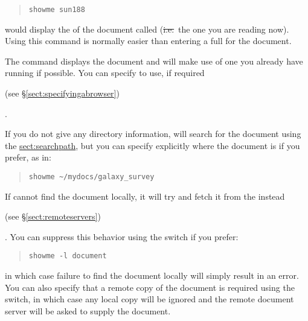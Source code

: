 \begin{quote}
\begin{verbatim}
showme sun188
\end{verbatim}
\end{quote}

would display the  of the
document called  (\st{i.e.}\ the one you
are reading now).  Using this command is normally easier than entering
a full  for the document.

The  command displays the document  and will make use of one you already
have running if possible. You can specify  to use, if required\begin{latexonly}
(see \S\ref{sect:specifyingabrowser})\end{latexonly}.

If you do not give any directory information,  will search
for the document using the \hyperref{\hi{HTX\_PATH} search
path}{\hi{HTX\_PATH} search path (see \S}{)}{sect:searchpath}, but you
can specify explicitly where the document is if you prefer, as in:

\begin{quote}
\begin{verbatim}
showme ~/mydocs/galaxy_survey
\end{verbatim}
\end{quote}

If  cannot find the document locally, it will try and fetch
it from the 
instead\begin{latexonly}
(see \S\ref{sect:remoteservers})
\end{latexonly}.
You can suppress this behavior using the  switch if you prefer:

\begin{quote}
\begin{verbatim}
showme -l document
\end{verbatim}
\end{quote}

in which case failure to find the document locally will simply result
in an error. You can also specify that a remote copy of the document
is required using the  switch, in which case any local copy
will be ignored and the remote document server will be asked to supply
the document.

